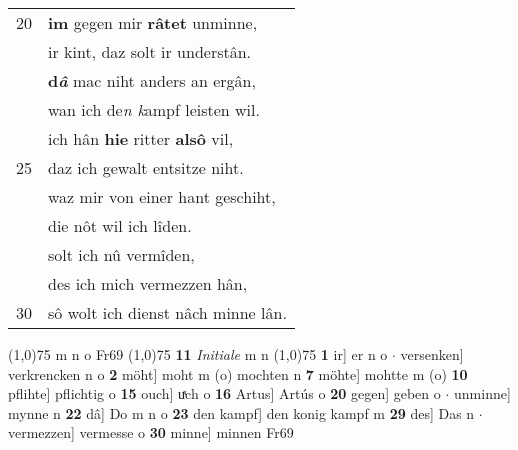 \documentclass[8pt,a4paper,notitlepage]{article}
\begin{document}
\begin{table}[ht]
\begin{minipage}[t]{0.5\linewidth}
\begin{tabular}{rl}
20 & \textbf{im} gegen mir \textbf{râtet} unminne,\\ 
 & ir kint, daz solt ir understân.\\ 
 & \textbf{d\textit{â}} mac niht anders an ergân,\\ 
 & wan ich de\textit{n k}ampf leisten wil.\\ 
 & ich hân \textbf{hie} ritter \textbf{alsô} vil,\\ 
25 & daz ich gewalt entsitze niht.\\ 
 & waz mir von einer hant geschiht,\\ 
 & die nôt wil ich lîden.\\ 
 & solt ich nû vermîden,\\ 
 & des ich mich vermezzen hân,\\ 
30 & sô wolt ich dienst nâch minne lân.\\ 
\end{tabular}
\scriptsize
\line(1,0){75} \newline
m n o Fr69 \newline
\line(1,0){75} \newline
\textbf{11} \textit{Initiale} m n  \newline
\line(1,0){75} \newline
\textbf{1} ir] er n o  $\cdot$ versenken] verkrencken n o \textbf{2} möht] moht m (o) mochten n \textbf{7} möhte] mohtte m (o) \textbf{10} pflihte] pflichtig o \textbf{15} ouch] uͯch o \textbf{16} Artus] Artús o \textbf{20} gegen] geben o  $\cdot$ unminne] mynne n \textbf{22} dâ] Do m n o \textbf{23} den kampf] den konig kampf m \textbf{29} des] Das n  $\cdot$ vermezzen] vermesse o \textbf{30} minne] minnen Fr69 \newline
\end{minipage}
\end{table}
\newpage
\end{document}
